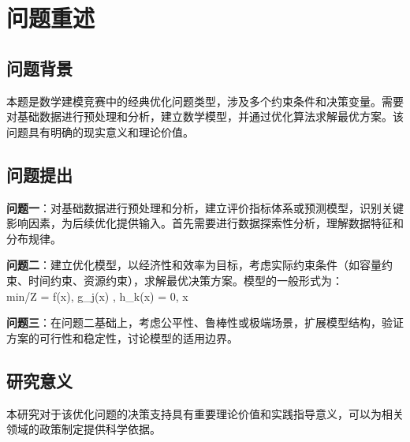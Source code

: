 \newpage
\section{问题重述}

\subsection{问题背景}
本题是数学建模竞赛中的经典优化问题类型，涉及多个约束条件和决策变量。需要对基础数据进行预处理和分析，建立数学模型，并通过优化算法求解最优方案。该问题具有明确的现实意义和理论价值。

\subsection{问题提出}
\textbf{问题一}：对基础数据进行预处理和分析，建立评价指标体系或预测模型，识别关键影响因素，为后续优化提供输入。首先需要进行数据探索性分析，理解数据特征和分布规律。

\textbf{问题二}：建立优化模型，以经济性和效率为目标，考虑实际约束条件（如容量约束、时间约束、资源约束），求解最优决策方案。模型的一般形式为：
\\min/\max \quad Z = f(x), \quad {} \quad g_j(x) , \; h_k(x) = 0, \; x \in {}

\textbf{问题三}：在问题二基础上，考虑公平性、鲁棒性或极端场景，扩展模型结构，验证方案的可行性和稳定性，讨论模型的适用边界。

\subsection{研究意义}
本研究对于该优化问题的决策支持具有重要理论价值和实践指导意义，可以为相关领域的政策制定提供科学依据。
